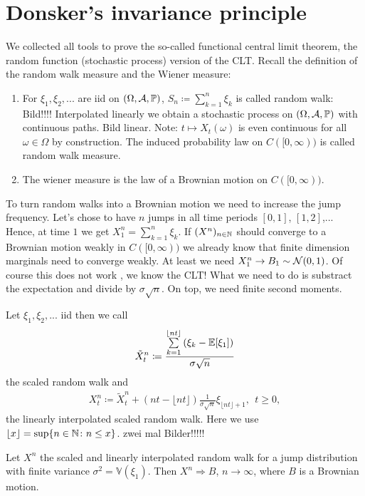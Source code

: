 \section{Donsker's invariance principle}
We collected all tools to prove the so-called functional central limit theorem, the random function (stochastic process) version of the CLT. Recall the definition of the random walk measure and the Wiener measure:
\begin{enumerate}
	\item
		For $\xi_1,\xi_2,...$ are iid on $(\Omega,\mathcal{A},\mathbb{P})$, $S_n \coloneqq \sum_{k=1}^n \xi_k$ is called random walk: Bild!!!!
		Interpolated linearly we obtain a stochastic process on $(\Omega,\mathcal{A},\mathbb{P})$ with continuous paths. Bild linear. Note: $t\mapsto X_t(\omega)$ is even continuous for all $\omega \in \Omega$ by construction. The induced probability law on $C([0,\infty))$ is called random walk measure.
	\item
		The wiener measure is the law of a Brownian motion on $C([0,\infty))$.
\end{enumerate}
To turn random walks into a Brownian motion we need to increase the jump frequency. Let's chose to have $n$ jumps in all time periods $[0,1]$, $[1,2]$,... Hence, at time $1$ we get $X_1^n = \sum_{k=1}^n \xi_k$. If $(X^n)_{n\in\mathbb{N}}$ should converge to a Brownian motion weakly in $C([0,\infty))$ we already know that finite dimension marginals need to converge weakly. At least we need $X_1^n \to B_1 \sim \mathcal{N}(0,1)$. Of course this does not work , we know the CLT! What we need to do is substract the expectation and divide by $\sigma \sqrt{n}$. On top, we need finite second moments.
\begin{deff1}
	Let $\xi_1,\xi_2,...$ iid then we call 
	\begin{align*}
		\tilde{X}_t^n \coloneqq \frac{\sum\limits_{k=1}^{\lfloor nt \rfloor}\left( \xi_k - \mathbb{E}[\xi_1]\right)}{\sigma \sqrt{n}}
	\end{align*}
	the scaled random walk and
	\begin{align*}
		X_t^n \coloneqq \tilde{X}_t^n + (nt - \lfloor nt \rfloor ) \frac{1}{\sigma \sqrt{n}} \xi_{\lfloor nt \rfloor + 1}, \:\: t\geq 0,
	\end{align*}
	the linearly interpolated scaled random walk. Here we use $\lfloor x \rfloor = \sup\{ n\in\mathbb{N}\colon n \leq x\}$.
	zwei mal Bilder!!!!!
\end{deff1}
\begin{lsatzwichtig}
\begin{theorem}
	Let $X^n$ the scaled and linearly interpolated random walk for a jump distribution with finite variance $\sigma^2 = \mathbb{V}(\xi_1)$. Then $X^n \Rightarrow B$, $n\to\infty$, where $B$ is a Brownian motion.
\end{theorem}
\end{lsatzwichtig}
